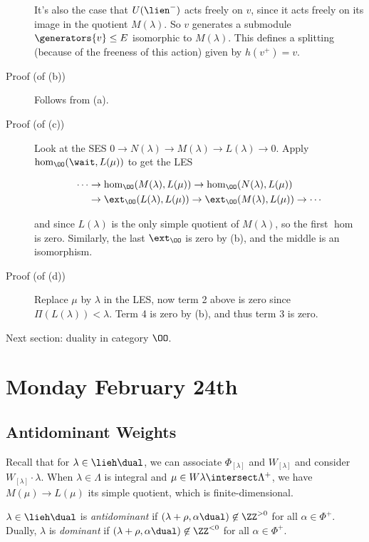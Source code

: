 \begin{description}
It's also the case that \(U(\lien^-)\) acts freely on \(v\), since it
acts freely on its image in the quotient \(M(\lambda)\). So \(v\)
generates a submodule \(\generators{v} \leq E\) isomorphic to
\(M(\lambda)\). This defines a splitting (because of the freeness of
this action) given by \(h(v^+) = v\).
\item[Proof (of (b))]
Follows from (a).
\item[Proof (of (c))]
Look at the SES \(0\to N(\lambda) \to M(\lambda) \to L(\lambda) \to 0\).
Apply \(\hom_\OO(\wait, L(\mu))\) to get the LES

\begin{align*}
\cdots &\to \hom_\OO(M(\lambda), L(\mu)) \to \hom_\OO( N(\lambda), L(\mu)  ) \\
&\to \ext_\OO( L(\lambda), L(\mu)  ) \to \ext_\OO( M(\lambda), L(\mu)  ) \to \cdots
\end{align*}

and since \(L(\lambda)\) is the only simple quotient of \(M(\lambda)\),
so the first \(\hom\) is zero. Similarly, the last \(\ext_\OO\) is zero
by (b), and the middle is an isomorphism.
\item[Proof (of (d))]
Replace \(\mu\) by \(\lambda\) in the LES, now term 2 above is zero
since \(\Pi(L(\lambda)) < \lambda\). Term 4 is zero by (b), and thus
term 3 is zero.
\end{description}

Next section: duality in category \(\OO\).

\hypertarget{monday-february-24th}{%
\section{Monday February 24th}\label{monday-february-24th}}

\hypertarget{antidominant-weights}{%
\subsection{Antidominant Weights}\label{antidominant-weights}}

Recall that for \(\lambda \in \lieh\dual\), we can associate
\(\Phi_{[\lambda]}\) and \(W_{[\lambda]}\) and consider
\(W_{[\lambda]} \cdot \lambda\). When \(\lambda \in \Lambda\) is
integral and \(\mu \in W\lambda \intersect \Lambda^+\), we have
\(M(\mu) \to L(\mu)\) its simple quotient, which is finite-dimensional.

\begin{description}
\tightlist
\item[Definition (Antidominant)]
\(\lambda \in \lieh\dual\) is \emph{antidominant} if
\((\lambda + \rho, \alpha\dual) \not\in \ZZ^{> 0}\) for all
\(\alpha \in \Phi^+\). Dually, \(\lambda\) is \emph{dominant} if
\((\lambda + \rho, \alpha\dual)\not\in\ZZ^{<0}\) for all
\(\alpha\in\Phi^+\).
\end{description}

